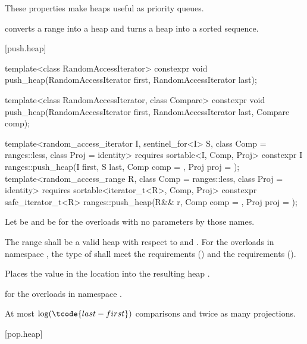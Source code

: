 \pnum
These properties make heaps useful as priority queues.

\pnum
{} converts a range into a heap and
 turns a heap into a sorted sequence.

[push.heap]{}

%
\begin{itemdecl}
template<class RandomAccessIterator>
  constexpr void push_heap(RandomAccessIterator first, RandomAccessIterator last);

template<class RandomAccessIterator, class Compare>
  constexpr void push_heap(RandomAccessIterator first, RandomAccessIterator last,
                           Compare comp);

template<random_access_iterator I, sentinel_for<I> S, class Comp = ranges::less,
         class Proj = identity>
  requires sortable<I, Comp, Proj>
  constexpr I
    ranges::push_heap(I first, S last, Comp comp = {}, Proj proj = {});
template<random_access_range R, class Comp = ranges::less, class Proj = identity>
  requires sortable<iterator_t<R>, Comp, Proj>
  constexpr safe_iterator_t<R>
    ranges::push_heap(R&& r, Comp comp = {}, Proj proj = {});
\end{itemdecl}

\begin{itemdescr}
\pnum
Let  be 
and  be 
for the overloads with no parameters by those names.

\pnum
\requires
The range 
shall be a valid heap with respect to  and .
For the overloads in namespace ,
the type of  shall meet
the  requirements () and
the  requirements ().

\pnum
\effects
Places the value in the location 
into the resulting heap .

\pnum
\returns
{} for the overloads in namespace .

\pnum
\complexity
At most $\log(\tcode{last - first})$ comparisons and twice as many projections.
\end{itemdescr}

[pop.heap]{}

